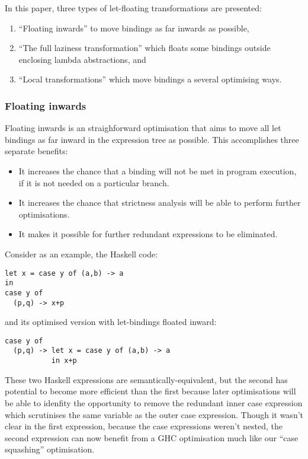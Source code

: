In this paper, three types of let-floating transformations are presented:
\begin{enumerate}
\item ``Floating inwards'' to move bindings as far inwards as possible,
\item ``The full laziness transformation'' which floats some bindings outside enclosing lambda abstractions, and
\item ``Local transformations'' which move bindings a several optimising ways.\cite{jones1996}
\end{enumerate}

\subsubsection*{Floating inwards}

Floating inwards is an straighforward optimisation that aims to move all let bindings as far inward in the expression tree as possible. This accomplishes three separate benefits:
\begin{itemize}
\item It increases the chance that a binding will not be met in program execution, if it is not needed on a particular branch.
\item It increases the chance that strictness analysis will be able to perform further optimisations.
\item It makes it possible for further redundant expressions to be eliminated.\cite{jones1996}
\end{itemize}

Consider as an example, the Haskell code:
\begin{lstlisting}
let x = case y of (a,b) -> a
in
case y of
  (p,q) -> x+p
\end{lstlisting}

and its optimised version with let-bindings floated inward:
\begin{lstlisting}
case y of
  (p,q) -> let x = case y of (a,b) -> a
           in x+p
\end{lstlisting}

These two Haskell expressions are semantically-equivalent, but the second has potential to become more efficient than the first because later optimisations will be able to idenfity the opportunity to remove the redundant inner case expression which scrutinises the same variable as the outer case expression.\cite{jones1996} Though it wasn't clear in the first expression, because the case expressions weren't nested, the second expression can now benefit from a GHC optimisation much like our ``case squashing'' optimisation.


